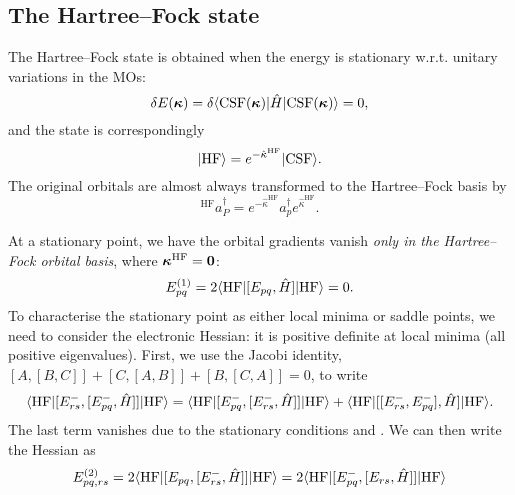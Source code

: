 \documentclass{article}
\begin{document}
\subsection{The Hartree--Fock state}
The Hartree--Fock state is obtained when the energy is stationary w.r.t. unitary variations in the MOs:
\begin{equation}
    \delta E(\bm{\mathrm{\kappa}})=\delta\langle \mathrm{CSF}(\bm{\mathrm{\kappa}})|\hat{H}|\mathrm{CSF}(\bm{\mathrm{\kappa}})\rangle=0,
\end{equation}
and the state is correspondingly
\begin{equation}
|\mathrm{HF}\rangle=e^{-\hat{\kappa}^{\mathrm{HF}}}|\mathrm{CSF}\rangle.
\end{equation}
The original orbitals are almost always transformed to the Hartree--Fock basis by
\begin{equation}
^{\mathrm{HF}}a_P^{\dagger}=e^{-\hat{\kappa}^{\mathrm{HF}}}a_p^{\dagger}e^{\hat{\kappa}^{\mathrm{HF}}}.
\end{equation}

At a stationary point, we have the orbital gradients vanish \textit{only in the Hartree--Fock orbital basis}, where $\bm{\mathrm{\kappa}}^{\mathrm{HF}}=\bm{\mathrm{0}}$:
\begin{equation}
    E_{pq}^{(1)}=2\langle\mathrm{HF}|[E_{pq},\hat{H}]|\mathrm{HF}\rangle=0.
\end{equation}
To characterise the stationary point as either local minima or saddle points, we need to consider the electronic Hessian: it is positive definite at local minima (all positive eigenvalues). First, we use the Jacobi identity, $[A,[B,C]]+[C,[A,B]]+[B,[C,A]]=0$, to write
\begin{equation}
\langle\mathrm{HF}|[E_{rs}^-,[E_{pq}^-,\hat{H}]]|\mathrm{HF}\rangle=\langle\mathrm{HF}|[E_{pq}^-,[E_{rs}^-,\hat{H}]]|\mathrm{HF}\rangle+\langle\mathrm{HF}|[[E_{rs}^-,E_{pq}^-],\hat{H}]|\mathrm{HF}\rangle.
\end{equation}
The last term vanishes due to the stationary conditions and \cite[eq. 10.2.6]{helgakerMolecularElectronicStructure2000}. We can then write the Hessian as
\begin{equation}
E_{pq,rs}^{(2)}=2\langle\mathrm{HF}|[E_{pq},[E_{rs}^-,\hat{H}]]|\mathrm{HF}\rangle=2\langle\mathrm{HF}|[E_{pq}^-,[E_{rs},\hat{H}]]|\mathrm{HF}\rangle
\end{equation}
\end{document}

